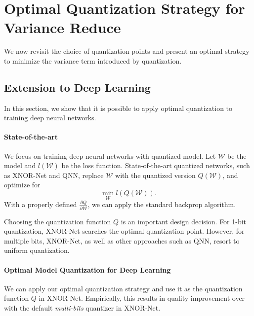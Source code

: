 \documentclass{article}
\begin{document}
\section{Optimal Quantization Strategy for Variance Reduce} \label{sec:optimal}

\vspace{-0.5em}
We now revisit the choice of quantization points
and present an optimal strategy to minimize 
the variance term introduced by quantization.



\vspace{-0.5em}
\subsection{Extension to Deep Learning}
\vspace{-0.5em}

In this section, we show that it is possible 
to apply optimal quantization to
training deep neural networks.

\paragraph*{State-of-the-art} We focus on
training deep neural networks with quantized
model. Let $\mathcal{W}$ be the model and 
$l(\mathcal{W})$ be the loss function. State-of-the-art quantized networks,
such as XNOR-Net and QNN, replace $\mathcal{W}$
with the quantized version $Q(\mathcal{W})$, and optimize
for
\[
\min_{\mathcal{W}} l(Q(\mathcal{W})).
\]
With a properly defined 
$\frac{\partial Q}{\partial{\mathcal{W}}}$, we can
apply the standard backprop 
algorithm.

Choosing the quantization function $Q$ is
an important design decision. For 1-bit quantization,
XNOR-Net searches the optimal quantization point. However, for multiple bits,
XNOR-Net, as well as other approaches such as QNN, resort
to uniform quantization.

\vspace{-0.5em}
\paragraph*{Optimal Model Quantization for Deep Learning}

We can apply our optimal quantization strategy 
and use it as the quantization function $Q$
in XNOR-Net. Empirically, this results in 
quality improvement
over with the default {\em multi-bits} quantizer in XNOR-Net. 
\end{document}
